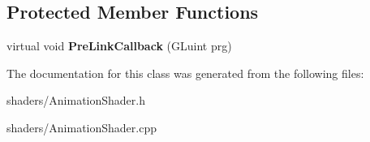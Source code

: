 \subsection*{\-Protected \-Member \-Functions}
\begin{DoxyCompactItemize}
\item 
\hypertarget{classAnimationShader_aa874fdcfad0626c5ba8a0058ceb59f2c}{virtual void {\bfseries \-Pre\-Link\-Callback} (\-G\-Luint prg)}\label{classAnimationShader_aa874fdcfad0626c5ba8a0058ceb59f2c}

\end{DoxyCompactItemize}


\-The documentation for this class was generated from the following files\-:\begin{DoxyCompactItemize}
\item 
shaders/\-Animation\-Shader.\-h\item 
shaders/\-Animation\-Shader.\-cpp\end{DoxyCompactItemize}
